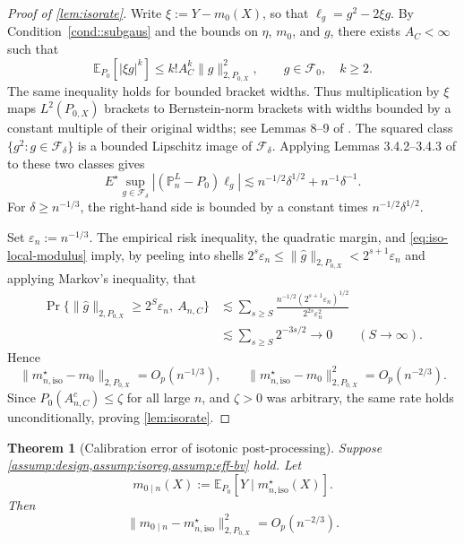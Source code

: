 \documentclass{article}
\theoremstyle{plain}
\newtheorem{theorem}{Theorem}
\theoremstyle{definition}
\newcommand{\E}{\mathbb{E}}
\newcommand{\1}{\mathbbm{1}}
\newcommand{\Pl}{\mathbb{P}^{L}_n}
\newcommand{\Px}{P_{0,X}}
\begin{document}
\begin{proof}[Proof of \cref{lem:isorate}]
Write \(\xi:=Y-m_0(X)\), so that \(\ell_g=g^2-2\xi g\). By Condition~\ref{cond::subgaus} and the bounds on \(\eta\), \(m_0\), and \(g\), there exists \(A_C<\infty\) such that
\begin{equation}
\label{eq:iso-multiplier-moments}
\E_{P_0}[|\xi g|^k]
\le k!A_C^k\|g\|_{2,\Px}^2,
\qquad g\in\mathcal F_0,\quad k\ge2.
\end{equation}
The same inequality holds for bounded bracket widths. Thus multiplication by \(\xi\) maps \(L^2(\Px)\) brackets to Bernstein-norm brackets with widths bounded by a constant multiple of their original widths; see Lemmas 8--9 of \citet{Bibaut2019}. The squared class \(\{g^2:g\in\mathcal F_\delta\}\) is a bounded Lipschitz image of \(\mathcal F_\delta\). Applying Lemmas 3.4.2--3.4.3 of \citet{vdvwellner1996} to these two classes gives
\begin{equation}
\label{eq:iso-local-modulus}
E^\star\sup_{g\in\mathcal F_\delta}|(\Pl-P_0)\ell_g|
\lesssim n^{-1/2}\delta^{1/2}+n^{-1}\delta^{-1}.
\end{equation}
For \(\delta\ge n^{-1/3}\), the right-hand side is bounded by a constant times \(n^{-1/2}\delta^{1/2}\).

Set \(\varepsilon_n:=n^{-1/3}\). The empirical risk inequality, the quadratic margin, and \eqref{eq:iso-local-modulus} imply, by peeling into shells \(2^s\varepsilon_n\le\|\hat g\|_{2,\Px}<2^{s+1}\varepsilon_n\) and applying Markov's inequality, that
\[
\begin{aligned}
\Pr\{\|\hat g\|_{2,\Px}\ge2^S\varepsilon_n,\ A_{n,C}\}
&\lesssim
\sum_{s\ge S}
\frac{n^{-1/2}(2^{s+1}\varepsilon_n)^{1/2}}
{2^{2s}\varepsilon_n^2}\\
&\lesssim\sum_{s\ge S}2^{-3s/2}
\longrightarrow0
\qquad(S\to\infty).
\end{aligned}
\]
Hence
\[
\|m_{n,\mathrm{iso}}^\star-m_0\|_{2,\Px}=O_p(n^{-1/3}),
\qquad
\|m_{n,\mathrm{iso}}^\star-m_0\|_{2,\Px}^2=O_p(n^{-2/3}).
\]
Since \(P_0(A_{n,C}^c)\le \zeta\) for all large \(n\), and \(\zeta>0\) was arbitrary, the same rate holds unconditionally, proving \cref{lem:isorate}.
\end{proof}

\begin{theorem}[Calibration error of isotonic post-processing]
\label{thm:iso-postcal}
Suppose \cref{assump:design,assump:isoreg,assump:eff-bv} hold. Let
\[
m_{0\mid n}(X):=\E_{P_0}[Y\mid m_{n,\mathrm{iso}}^\star(X)].
\]
Then
\[
\|m_{0\mid n}-m_{n,\mathrm{iso}}^\star\|_{2,\Px}^2=O_p(n^{-2/3}).
\]
\end{theorem}
\end{document}
